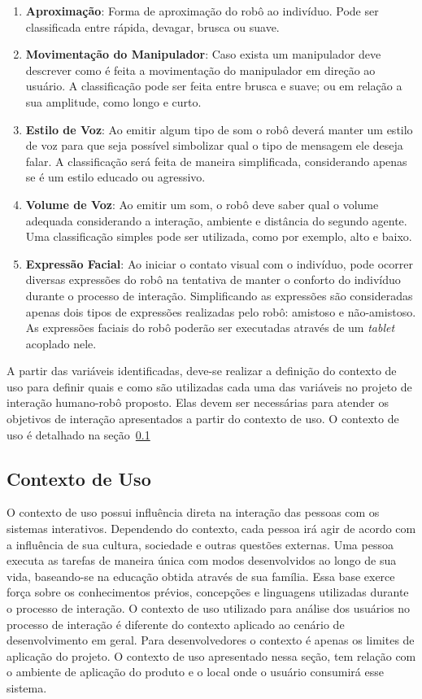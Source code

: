 \begin{enumerate}
    \item \textbf{Aproximação}: Forma de aproximação do robô ao indivíduo. Pode ser classificada entre rápida, devagar, brusca ou suave.
    \item \textbf{Movimentação do Manipulador}: Caso exista um manipulador deve descrever como é feita a movimentação do manipulador em direção ao usuário. A classificação pode ser feita entre brusca e suave; ou em relação a sua amplitude, como longo e curto.
    \item \textbf{Estilo de Voz}: Ao emitir algum tipo de som o robô deverá manter um estilo de voz para que seja possível simbolizar qual o tipo de mensagem ele deseja falar. A classificação será feita de maneira simplificada, considerando apenas se é um estilo educado ou agressivo.
    \item \textbf{Volume de Voz}: Ao emitir um som, o robô deve saber qual o volume adequada considerando a interação, ambiente e distância do segundo agente. Uma classificação simples pode ser utilizada, como por exemplo, alto e baixo.
    \item \textbf{Expressão Facial}: Ao iniciar o contato visual com o indivíduo, pode ocorrer diversas expressões do robô na tentativa de manter o conforto do indivíduo durante o processo de interação. Simplificando as expressões são consideradas apenas dois tipos de expressões realizadas pelo robô: amistoso e não-amistoso. As expressões faciais do robô poderão ser executadas através de um \emph{tablet} acoplado nele.
\end{enumerate}

A partir das variáveis identificadas, deve-se realizar a definição do contexto de uso para definir quais e como são utilizadas cada uma das variáveis no projeto de interação humano-robô proposto. Elas devem ser necessárias para atender os objetivos de interação apresentados a partir do contexto de uso. O contexto de uso é detalhado na seção~\ref{sec:contextouso}

\subsection{Contexto de Uso}
\label{sec:contextouso}
O contexto de uso possui influência direta na interação das pessoas com os sistemas interativos. Dependendo do contexto, cada pessoa irá agir de acordo com a influência de sua cultura, sociedade e outras questões externas. Uma pessoa executa as tarefas de maneira única com modos desenvolvidos ao longo de sua vida, baseando-se na educação obtida através de sua família. Essa base exerce força sobre os conhecimentos prévios, concepções e linguagens utilizadas durante o processo de interação. O contexto de uso utilizado para análise dos usuários no processo de interação é diferente do contexto aplicado ao cenário de desenvolvimento em geral. Para desenvolvedores o contexto é apenas os limites de aplicação do projeto. O contexto de uso apresentado nessa seção, tem relação com o ambiente de aplicação do produto e o local onde o usuário consumirá esse sistema.

